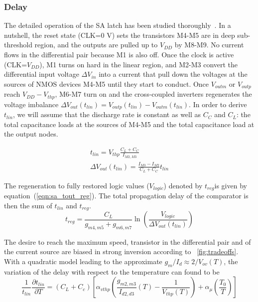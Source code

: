 \subsubsection{Delay}
The detailed operation of the SA latch has been studied thoroughly~\cite{Wicht2004, Razavi2015}.
In a nutshell, the reset state (CLK=0 V) sets the transistors M4-M5 are in deep sub-threshold region, and the outputs are pulled up to \(V_{DD}\) by M8-M9. No current flows in the differential pair because M1 is also off.
Once the clock is active (CLK=\(V_{DD}\)), M1 turns on hard in the linear region, and M2-M3 convert the differential input voltage \(\Delta V_{in}\) into a current that pull down the voltages at the sources of NMOS devices M4-M5 until they start to conduct.
Once \(V_{outm}\) or \(V_{outp}\) reach \(V_{DD}-V_{thp}\), M6-M7 turn on and the cross-coupled inverters regenerates the voltage imbalance \(\Delta V_{out}(t_{lin}) = V_{outp}(t_{lin}) - V_{outm}(t_{lin})\). In order to derive \(t_{lin}\), we will assume that the discharge rate is constant as well as \(C_{C}\) and \(C_{L}\): the total capacitance loads at the sources of M4-M5 and the total capacitance load at the output nodes.

\begin{eqnarray}
\label{eq:sa_tout_lin}
t_{lin} = V_{thp}\frac{{C_{L}+C_C}}{I_{M2,M3}}   \\
\Delta V_{out}(t_{lin}) = \frac{I_{M3}-I_{M2}}{{C_{L}+C_C}}t_{lin}  \label{eq:sa_dout_lin}
\end{eqnarray}

The regeneration to fully restored logic values (\(V_{logic}\)) denoted by \(t_{reg}\)is given by equation~(\ref{eqn:sa_tout_reg}). The total propagation delay of the comparator is then the sum of \(t_{lin}\) and \(t_{reg}\).
\begin{equation}
    \label{eqn:sa_tout_reg}
t_{reg} = \frac{C_{L}}{g_{m4,m5}+g_{m6,m7}} \ln{\left(\frac{V_{logic}}{\Delta V_{out}(t_{lin})}\right)}
\end{equation}

The desire to reach the maximum speed, transistor in the differential pair and of the current source are biased in strong inversion according to \figurename~\ref{fig:tradeoffs}. With a quadratic model leading to the approximate \(g_m/I_d \approx 2/V_{ov}(T)\), the variation of the delay with respect to the temperature can found to be 
\begin{equation}
\label{eqn:sa_dt_dT}
\frac{1}{t_{lin}}\frac{\partial t_{lin}}{\partial T} = (C_L+C_c) \left[ \alpha_{vthp} \left(\frac{g_{m2,m3}}{I_{d2,d3}}(T) - \frac{1}{V_{thp}(T)} \right) + \alpha_\mu \left(\frac{T_0}{T} \right) \right]
\end{equation}

